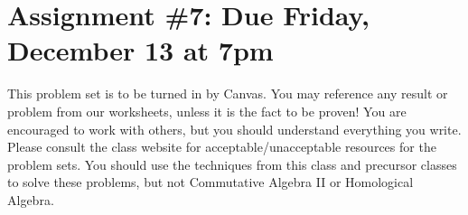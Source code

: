 \documentclass[12pt]{amsart}
\newcommand{\showsol}[1]{\def\displaysol{#1}}
\begin{document}
\showsol{1}
	
	\thispagestyle{empty}
	
	\section*{Assignment \#7: Due Friday, December 13 at 7pm}
	
	This problem set is to be turned in by Canvas. You may reference any result or problem from our worksheets, unless it is the fact to be proven! You are encouraged to work with others, but you should understand everything you write. Please consult the class website for acceptable/unacceptable resources for the problem sets. You should use the techniques from this class and precursor classes to solve these problems, but not Commutative Algebra II or Homological Algebra.
	
	
	\
	
\end{document}
